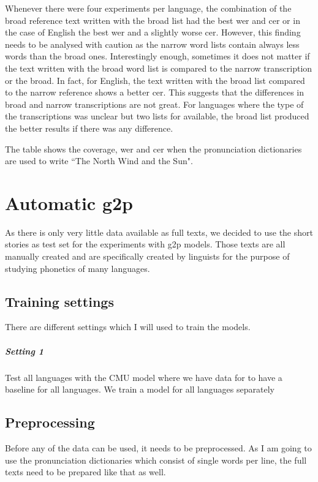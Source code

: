 Whenever there were four experiments per language, the combination of the broad reference text written with the broad list had the best \ac{wer} and \ac{cer} or in the case of English the best \ac{wer} and a slightly worse \ac{cer}. However, this finding needs to be analysed with caution as the narrow word lists contain always less words than the broad ones. Interestingly enough, sometimes it does not matter if the text written with the broad word list is compared to the narrow transcription or the broad. In fact, for English, the text written with the broad list compared to the narrow reference shows a better \ac{cer}. This suggests that the differences in broad and narrow transcriptions are not great.
For languages where the type of the transcriptions was unclear but two lists for available, the broad list produced the better results if there was any difference. 



\begin{table}[h!]
\begin{center}
\caption[Coverage of Pronunciation Dictionaries]{The table shows the coverage, \ac{wer} and \ac{cer} when the pronunciation dictionaries are used to write ``The North Wind and the Sun".}
\label{tab:coverage}
\end{center}
\end{table}

\section{Automatic \ac{g2p}}
As there is only very little data available as full texts, we decided to use the short stories as test set for the experiments with \ac{g2p} models. Those texts are all manually created and are specifically created by linguists for the purpose of studying phonetics of many languages. 

\subsection{Training settings}
There are different settings which I will used to train the models.

\subparagraph{Setting 1}
Test all languages with the CMU model where we have data for to have a baseline for all languages. We train a model for all languages separately

\subsection{Preprocessing}
Before any of the data can be used, it needs to be preprocessed. As I am going to use the pronunciation dictionaries which consist of single words per line, the full texts need to be prepared like that as well.

